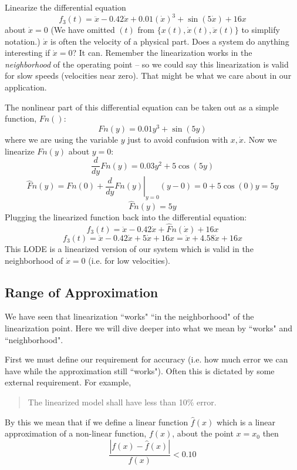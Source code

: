 \newpage\begin{ExampleSmall}
Linearize the differential equation
\[
f_3(t) =   \ddot{x} - 0.42\dot{x} + 0.01(\dot{x})^3 + \sin(5\dot{x}) + 16x
\]
about $\dot{x} = 0$  (We have omitted $(t)$ from $\{x(t), \dot{x}(t),\ddot{x}(t)\}$ to simplify notation.)
$\dot{x}$ is often the velocity of a physical part.
Does a system do anything interesting if $\dot{x} = 0$?  It can.  Remember the linearization works
in the {\it neighborhood} of the operating point -- so we could say this linearization is valid for slow speeds
(velocities near zero).  That might be what we care about in our application.


\vspace{0.2in}
The nonlinear part of this differential equation can be taken out as a simple function, $Fn()$:
\[
Fn(y) = 0.01y^3+\sin(5y)
\]
where we are using the variable $y$ just to avoid confusion with $x,\dot{x}$.   Now we linearize $Fn(y)$ about $y=0$:
\[
\frac{d} {dy}Fn(y)  = 0.03y^2+5\cos(5y)
\]
\[
\hat{F}n(y) = Fn(0) + \left . \frac{d} {dy}Fn(y) \right|_{y=0} (y-0) = 0 + 5\cos(0)y = 5y
\]\[
\hat{F}n(y) = 5y
\]
Plugging the linearized function back into the differential equation:
\[
f_3(t) =   \ddot{x} - 0.42\dot{x} + \hat{F}n(\dot{x}) + 16x
\]
\[
f_3(t) =   \ddot{x} - 0.42\dot{x} + 5\dot{x} + 16x = \ddot{x} + 4.58\dot{x} + 16x
\]
This LODE is a linearized version of our system which is valid in the neighborhood of $\dot{x}=0$ (i.e. for low velocities).
\end{ExampleSmall}


\subsection{Range of Approximation}
We have seen that linearization ``works" ``in the neighborhood" of the linearization point.   Here we will dive deeper into what
we mean by ``works" and ``neighborhood".

First we must define our requirement for accuracy (i.e. how much error we can have while the approximation still ``works").
Often this is dictated by some external requirement.  For example,
\begin{quotation}
The linearized model shall have less than 10\% error.
\end{quotation}
By this we mean that if we define a linear function $\hat{f}(x)$ which is a linear approximation of a non-linear function,
$f(x)$, about the point $x = x_0$ then
\[
\frac   {|f(x)-\hat{f}(x)| } {f(x)} < 0.10
\]

